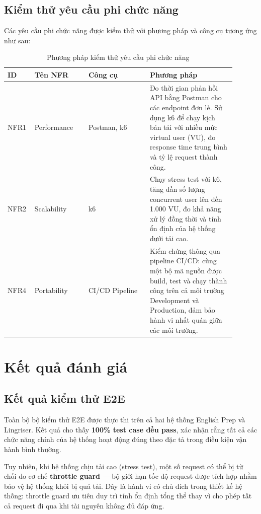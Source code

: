 \subsection{Kiểm thử yêu cầu phi chức năng}

Các yêu cầu phi chức năng được kiểm thử với phương pháp và công cụ tương ứng như sau:

\begin{table}[H]
\centering
\caption{Phương pháp kiểm thử yêu cầu phi chức năng}
\renewcommand{\arraystretch}{1.4}
\small
\begin{tabular}{|p{0.08\linewidth}|p{0.22\linewidth}|p{0.25\linewidth}|p{0.35\linewidth}|}
\hline
\textbf{ID} & \textbf{Tên NFR} & \textbf{Công cụ} & \textbf{Phương pháp} \\
\hline
NFR1 & Performance & Postman, k6 & Đo thời gian phản hồi API bằng Postman cho các endpoint đơn lẻ. Sử dụng k6 để chạy kịch bản tải với nhiều mức virtual user (VU), đo response time trung bình và tỷ lệ request thành công. \\
\hline
NFR2 & Scalability & k6 & Chạy stress test với k6, tăng dần số lượng concurrent user lên đến 1.000 VU, đo khả năng xử lý đồng thời và tính ổn định của hệ thống dưới tải cao. \\
\hline
NFR4 & Portability & CI/CD Pipeline & Kiểm chứng thông qua pipeline CI/CD: cùng một bộ mã nguồn được build, test và chạy thành công trên cả môi trường Development và Production, đảm bảo hành vi nhất quán giữa các môi trường. \\
\hline
\end{tabular}
\end{table}

\section{Kết quả đánh giá}

\subsection{Kết quả kiểm thử E2E}

Toàn bộ bộ kiểm thử E2E được thực thi trên cả hai hệ thống English Prep và Lingriser. Kết quả cho thấy \textbf{100\% test case đều pass}, xác nhận rằng tất cả các chức năng chính của hệ thống hoạt động đúng theo đặc tả trong điều kiện vận hành bình thường.

Tuy nhiên, khi hệ thống chịu tải cao (stress test), một số request có thể bị từ chối do cơ chế \textbf{throttle guard} --- bộ giới hạn tốc độ request được tích hợp nhằm bảo vệ hệ thống khỏi bị quá tải. Đây là hành vi có chủ đích trong thiết kế hệ thống: throttle guard ưu tiên duy trì tính ổn định tổng thể thay vì cho phép tất cả request đi qua khi tài nguyên không đủ đáp ứng.

